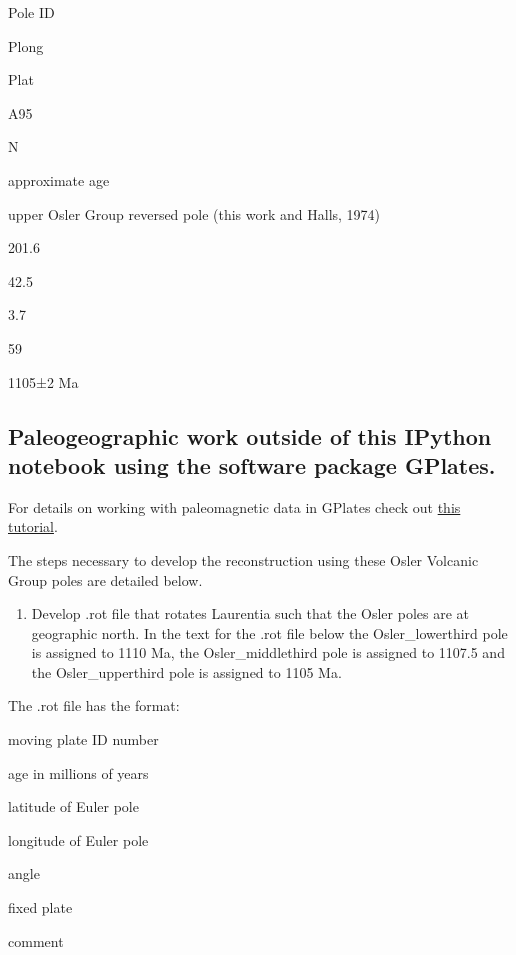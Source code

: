 \documentclass[letterpaper,10pt,english]{/Users/polarwander/Library/Enthought/Canopy_64bit/User/lib/python2.7/site-packages/sphinx/texinputs/sphinxhowto}
\begin{document}
        
    
Pole ID

Plong

Plat

A95

N

approximate age

upper Osler Group reversed pole (this work and Halls, 1974)

201.6

42.5

3.7

59

1105±2 Ma\subsection{Paleogeographic work outside of this IPython notebook using the software
package GPlates.}For details on working with paleomagnetic data in GPlates check out
\href{https://docs.google.com/document/pub?id=1gdgHIaC5WpjLaRZu1JwqotV8zOrgnfu_fZ3aNwQZNmU}{this
tutorial}.

The steps necessary to develop the reconstruction using these Osler
Volcanic Group poles are detailed below.\begin{enumerate}
\def\labelenumi{(\arabic{enumi})}
\itemsep1pt\parskip0pt
\item
  Develop .rot file that rotates Laurentia such that the Osler poles are
  at geographic north. In the text for the .rot file below the
  Osler\_lowerthird pole is assigned to 1110 Ma, the Osler\_middlethird
  pole is assigned to 1107.5 and the Osler\_upperthird pole is assigned
  to 1105 Ma.
\end{enumerate}

The .rot file has the format:

moving plate ID number

age in millions of years

latitude of Euler pole

longitude of Euler pole

angle

fixed plate

comment
\end{document}
